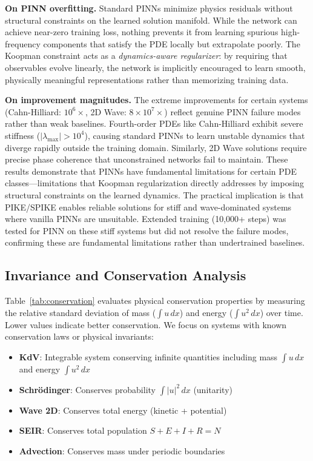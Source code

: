 \documentclass{article}
\theoremstyle{remark}
\begin{document}
\textbf{On PINN overfitting.} Standard PINNs minimize physics residuals without structural constraints on the learned solution manifold. While the network can achieve near-zero training loss, nothing prevents it from learning spurious high-frequency components that satisfy the PDE locally but extrapolate poorly. The Koopman constraint acts as a \emph{dynamics-aware regularizer}: by requiring that observables evolve linearly, the network is implicitly encouraged to learn smooth, physically meaningful representations rather than memorizing training data.

\textbf{On improvement magnitudes.} The extreme improvements for certain systems (Cahn-Hilliard: $10^6\times$, 2D Wave: $8 \times 10^7\times$) reflect genuine PINN failure modes rather than weak baselines. Fourth-order PDEs like Cahn-Hilliard exhibit severe stiffness ($|\lambda_{\max}| > 10^4$), causing standard PINNs to learn unstable dynamics that diverge rapidly outside the training domain. Similarly, 2D Wave solutions require precise phase coherence that unconstrained networks fail to maintain. These results demonstrate that PINNs have fundamental limitations for certain PDE classes---limitations that Koopman regularization directly addresses by imposing structural constraints on the learned dynamics. The practical implication is that PIKE/SPIKE enables reliable solutions for stiff and wave-dominated systems where vanilla PINNs are unsuitable. Extended training (10,000+ steps) was tested for PINN on these stiff systems but did not resolve the failure modes, confirming these are fundamental limitations rather than undertrained baselines.

\subsection{Invariance and Conservation Analysis}

Table~\ref{tab:conservation} evaluates physical conservation properties by measuring the relative standard deviation of mass ($\int u \, dx$) and energy ($\int u^2 \, dx$) over time. Lower values indicate better conservation. We focus on systems with known conservation laws or physical invariants:

\begin{itemize}
\item \textbf{KdV}: Integrable system conserving infinite quantities including mass $\int u\,dx$ and energy $\int u^2\,dx$
\item \textbf{Schr\"odinger}: Conserves probability $\int |u|^2\,dx$ (unitarity)
\item \textbf{Wave 2D}: Conserves total energy (kinetic + potential)
\item \textbf{SEIR}: Conserves total population $S + E + I + R = N$
\item \textbf{Advection}: Conserves mass under periodic boundaries
\end{itemize}
\end{document}
